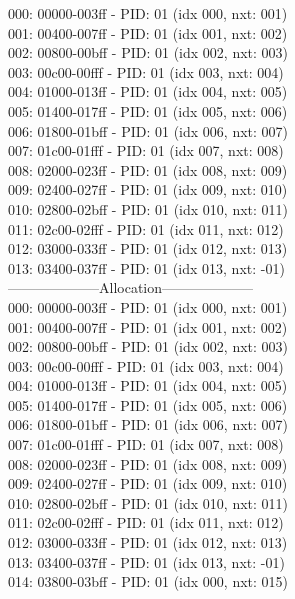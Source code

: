 \documentclass[10pt]{article}
\begin{document}
000: 00000-003ff - PID: 01 (idx 000, nxt: 001)\\
001: 00400-007ff - PID: 01 (idx 001, nxt: 002)\\
002: 00800-00bff - PID: 01 (idx 002, nxt: 003)\\
003: 00c00-00fff - PID: 01 (idx 003, nxt: 004)\\
004: 01000-013ff - PID: 01 (idx 004, nxt: 005)\\
005: 01400-017ff - PID: 01 (idx 005, nxt: 006)\\
006: 01800-01bff - PID: 01 (idx 006, nxt: 007)\\
007: 01c00-01fff - PID: 01 (idx 007, nxt: 008)\\
008: 02000-023ff - PID: 01 (idx 008, nxt: 009)\\
009: 02400-027ff - PID: 01 (idx 009, nxt: 010)\\
010: 02800-02bff - PID: 01 (idx 010, nxt: 011)\\
011: 02c00-02fff - PID: 01 (idx 011, nxt: 012)\\
012: 03000-033ff - PID: 01 (idx 012, nxt: 013)\\
013: 03400-037ff - PID: 01 (idx 013, nxt: -01)\\
--------------------Allocation-------------------- \\
000: 00000-003ff - PID: 01 (idx 000, nxt: 001)\\
001: 00400-007ff - PID: 01 (idx 001, nxt: 002)\\
002: 00800-00bff - PID: 01 (idx 002, nxt: 003)\\
003: 00c00-00fff - PID: 01 (idx 003, nxt: 004)\\
004: 01000-013ff - PID: 01 (idx 004, nxt: 005)\\
005: 01400-017ff - PID: 01 (idx 005, nxt: 006)\\
006: 01800-01bff - PID: 01 (idx 006, nxt: 007)\\
007: 01c00-01fff - PID: 01 (idx 007, nxt: 008)\\
008: 02000-023ff - PID: 01 (idx 008, nxt: 009)\\
009: 02400-027ff - PID: 01 (idx 009, nxt: 010)\\
010: 02800-02bff - PID: 01 (idx 010, nxt: 011)\\
011: 02c00-02fff - PID: 01 (idx 011, nxt: 012)\\
012: 03000-033ff - PID: 01 (idx 012, nxt: 013)\\
013: 03400-037ff - PID: 01 (idx 013, nxt: -01)\\
014: 03800-03bff - PID: 01 (idx 000, nxt: 015)\\
\end{document}
